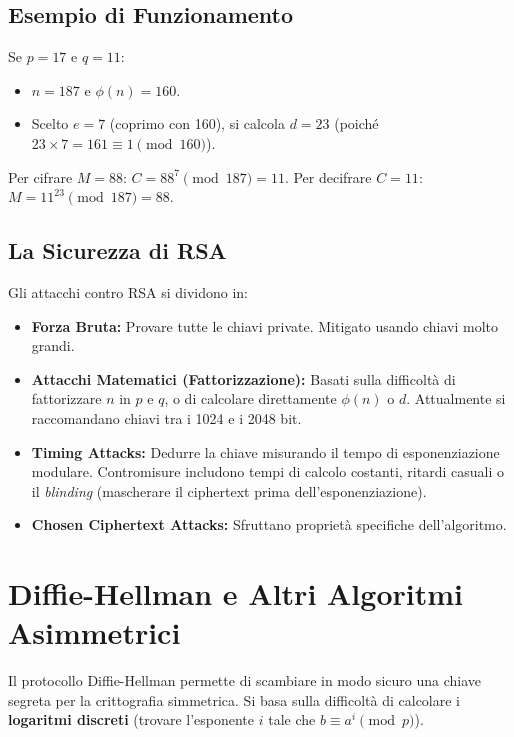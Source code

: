 \subsection{Esempio di Funzionamento}
Se $p=17$ e $q=11$:
\begin{itemize}
    \item $n = 187$ e $\phi(n) = 160$.
    \item Scelto $e=7$ (coprimo con 160), si calcola $d=23$ (poiché $23 \times 7 = 161 \equiv 1 \pmod{160}$).
\end{itemize}
Per cifrare $M=88$: $C = 88^7 \pmod{187} = 11$.
Per decifrare $C=11$: $M = 11^{23} \pmod{187} = 88$.

\subsection{La Sicurezza di RSA}
Gli attacchi contro RSA si dividono in:
\begin{itemize}
    \item \textbf{Forza Bruta:} Provare tutte le chiavi private. Mitigato usando chiavi molto grandi.
    \item \textbf{Attacchi Matematici (Fattorizzazione):} Basati sulla difficoltà di fattorizzare $n$ in $p$ e $q$, o di calcolare direttamente $\phi(n)$ o $d$. Attualmente si raccomandano chiavi tra i 1024 e i 2048 bit.
    \item \textbf{Timing Attacks:} Dedurre la chiave misurando il tempo di esponenziazione modulare. Contromisure includono tempi di calcolo costanti, ritardi casuali o il \textit{blinding} (mascherare il ciphertext prima dell'esponenziazione).
    \item \textbf{Chosen Ciphertext Attacks:} Sfruttano proprietà specifiche dell'algoritmo.
\end{itemize}

\section{Diffie-Hellman e Altri Algoritmi Asimmetrici}



Il protocollo Diffie-Hellman permette di scambiare in modo sicuro una chiave segreta per la crittografia simmetrica. Si basa sulla difficoltà di calcolare i \textbf{logaritmi discreti} (trovare l'esponente $i$ tale che $b \equiv a^i \pmod{p}$).

